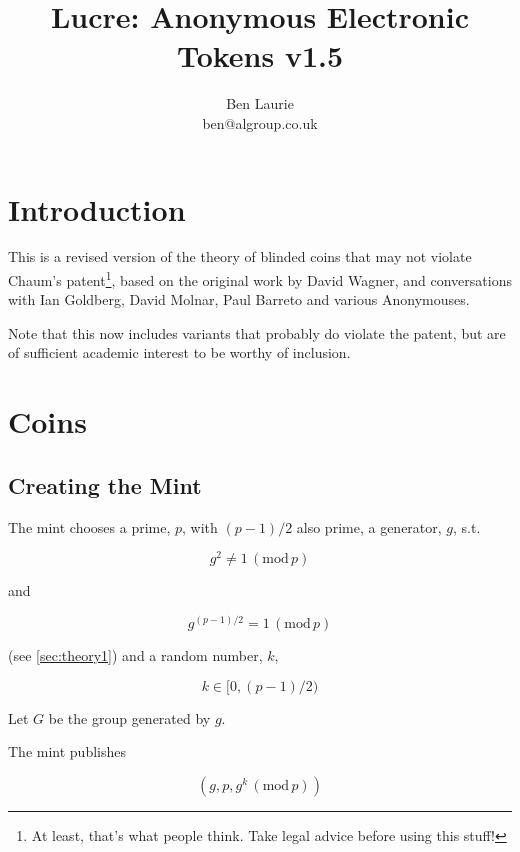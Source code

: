 \documentclass[a4paper,titlepage]{article}
\title{Lucre: Anonymous Electronic Tokens v1.5}
\author{Ben Laurie \\
ben@algroup.co.uk}
\begin{document}
\maketitle

\def\mod#1{\,(\textrm{mod}\,#1)}
\def\implies{\Rightarrow}
\def\qe#1{\begin{equation}#1\end{equation}}
\def\qearray#1{\begin{eqnarray}#1\end{eqnarray}}
\def\oneway#1{\textrm{oneway}(#1)}
\def\preoneway#1{\textrm{preoneway}(#1)}

\setlength{\parindent}{0pt}
\setlength{\parskip}{1ex plus 0.5ex minus 0.2ex}

\section{Introduction}

This is a revised version of the theory of blinded coins that may not
violate Chaum's patent\footnote{At least, that's what people
think. Take legal advice before using this stuff!}, based on the
original work by David Wagner, and conversations with Ian Goldberg,
David Molnar, Paul Barreto and various Anonymouses.

Note that this now includes variants that probably do violate the
patent, but are of sufficient academic interest to be worthy of
inclusion.

\section{Coins}

\subsection{Creating the Mint}

The mint chooses a prime, $p$, with $(p-1)/2$ also prime, a generator,
$g$, s.t.

\qe{g^2 \neq 1 \mod p}

and

\qe{\label{eq:1}g^{(p-1)/2} = 1 \mod p}

(see \ref{sec:theory1}) and a random number, $k$,

\qe{k \in [0,(p-1)/2)}

Let $G$ be the group generated by $g$.

The mint publishes

\qe{(g,p,g^k \mod p)}
\end{document}
